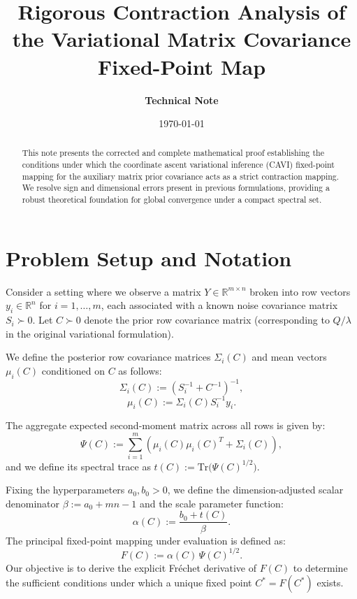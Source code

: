 \documentclass[11pt,a4paper]{article}
\title{\textbf{Rigorous Contraction Analysis of the Variational Matrix Covariance Fixed-Point Map}}
\author{\textbf{Technical Note}}
\date{\today}
\begin{document}
\maketitle

\begin{abstract}
This note presents the corrected and complete mathematical proof establishing the conditions under which the coordinate ascent variational inference (CAVI) fixed-point mapping for the auxiliary matrix prior covariance acts as a strict contraction mapping. We resolve sign and dimensional errors present in previous formulations, providing a robust theoretical foundation for global convergence under a compact spectral set.
\end{abstract}

\section{Problem Setup and Notation}
Consider a setting where we observe a matrix $Y \in \mathbb{R}^{m \times n}$ broken into row vectors $y_i \in \mathbb{R}^n$ for $i=1,\dots,m$, each associated with a known noise covariance matrix $S_i \succ 0$. Let $C \succ 0$ denote the prior row covariance matrix (corresponding to $Q/\lambda$ in the original variational formulation). 

We define the posterior row covariance matrices $\Sigma_i(C)$ and mean vectors $\mu_i(C)$ conditioned on $C$ as follows:
\begin{equation}
\Sigma_i(C) := \left(S_i^{-1} + C^{-1}\right)^{-1},
\end{equation}
\begin{equation}
\mu_i(C) := \Sigma_i(C) S_i^{-1} y_i.
\end{equation}

The aggregate expected second-moment matrix across all rows is given by:
\begin{equation}
\Psi(C) := \sum_{i=1}^m \left( \mu_i(C)\mu_i(C)^T + \Sigma_i(C)\right),
\end{equation}
and we define its spectral trace as $t(C) := \text{Tr}\big(\Psi(C)^{1/2}\big)$.

Fixing the hyperparameters $a_0, b_0 > 0$, we define the dimension-adjusted scalar denominator $\beta := a_0 + mn - 1$ and the scale parameter function:
\begin{equation}
\alpha(C) := \frac{b_0 + t(C)}{\beta}.
\end{equation}
The principal fixed-point mapping under evaluation is defined as:
\begin{equation}\label{eq:F-def}
F(C) := \alpha(C)\,\Psi(C)^{1/2}.
\end{equation}
Our objective is to derive the explicit Fr\'echet derivative of $F(C)$ to determine the sufficient conditions under which a unique fixed point $C^* = F(C^*)$ exists.
\end{document}

